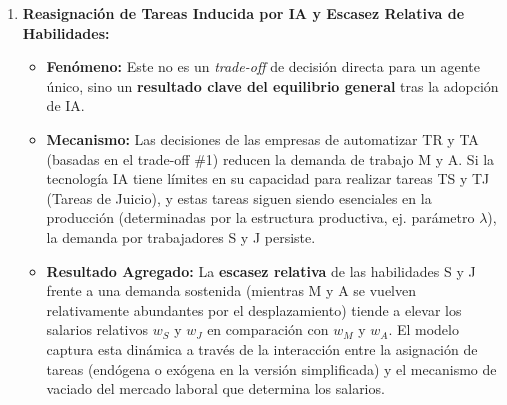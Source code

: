 \documentclass{article}
\theoremstyle{remark}
\theoremstyle{definition}
\begin{document}
\begin{enumerate}
\begin{tcolorbox}[title= Solución Punto 1 (Revisado - Versión Preferida)]
\begin{enumerate}
    \item \textbf{Reasignación de Tareas Inducida por IA y Escasez Relativa de Habilidades:}
        \begin{itemize}
            \item \textbf{Fenómeno:} Este no es un \textit{trade-off} de decisión directa para un agente único, sino un \textbf{resultado clave del equilibrio general} tras la adopción de IA.
            \item \textbf{Mecanismo:} Las decisiones de las empresas de automatizar TR y TA (basadas en el trade-off \#1) reducen la demanda de trabajo M y A. Si la tecnología IA tiene límites en su capacidad para realizar tareas TS y TJ (Tareas de Juicio), y estas tareas siguen siendo esenciales en la producción (determinadas por la estructura productiva, ej. parámetro $\lambda$), la demanda por trabajadores S y J persiste.
            \item \textbf{Resultado Agregado:} La \textbf{escasez relativa} de las habilidades S y J frente a una demanda sostenida (mientras M y A se vuelven relativamente abundantes por el desplazamiento) tiende a elevar los salarios relativos $w_S$ y $w_J$ en comparación con $w_M$ y $w_A$. El modelo captura esta dinámica a través de la interacción entre la asignación de tareas (endógena o exógena en la versión simplificada) y el mecanismo de vaciado del mercado laboral que determina los salarios.
        \end{itemize}
        \vspace{0.5em}


\end{enumerate}
\end{tcolorbox}
\end{enumerate}
\end{document}
